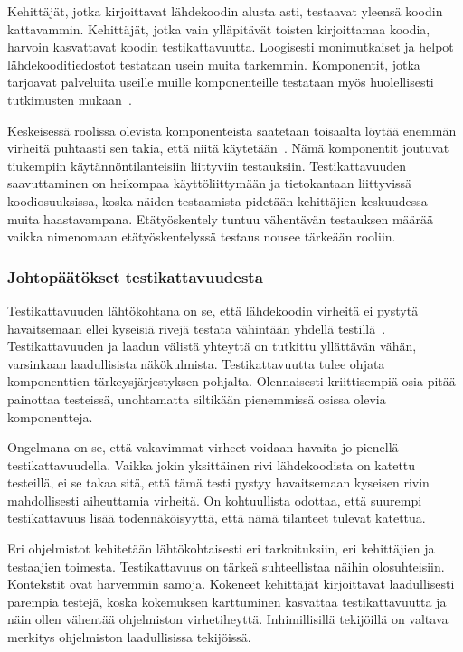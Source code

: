 \documentclass[finnish]{../tktltiki2}
\theoremstyle{definition}
\theoremstyle{remark}
\begin{document}
    Kehittäjät, jotka kirjoittavat lähdekoodin alusta asti, testaavat yleensä koodin kattavammin. Kehittäjät, jotka vain 
ylläpitävät toisten kirjoittamaa koodia, harvoin kasvattavat koodin testikattavuutta. Loogisesti monimutkaiset 
ja helpot lähdekooditiedostot testataan usein muita tarkemmin. Komponentit, jotka tarjoavat palveluita useille muille 
komponenteille testataan myös huolellisesti tutkimusten mukaan~\cite{MNDT09}.

    Keskeisessä roolissa olevista komponenteista saatetaan toisaalta löytää enemmän virheitä puhtaasti sen takia, että 
niitä käytetään~\cite{MNDT09}. Nämä komponentit joutuvat tiukempiin käytännöntilanteisiin liittyviin testauksiin. 
Testikattavuuden saavuttaminen on heikompaa käyttöliittymään ja tietokantaan liittyvissä koodiosuuksissa, koska näiden 
testaamista pidetään kehittäjien keskuudessa muita haastavampana. Etätyöskentely tuntuu vähentävän testauksen määrää 
vaikka nimenomaan etätyöskentelyssä testaus nousee tärkeään rooliin.

\subsubsection{Johtopäätökset testikattavuudesta}

Testikattavuuden lähtökohtana on se, että lähdekoodin virheitä ei pystytä havaitsemaan ellei kyseisiä rivejä testata 
vähintään yhdellä testillä~\cite{MNDT09}. Testikattavuuden ja laadun välistä yhteyttä on tutkittu yllättävän vähän, 
varsinkaan laadullisista näkökulmista. Testikattavuutta tulee ohjata komponenttien tärkeysjärjestyksen pohjalta. 
Olennaisesti kriittisempiä osia pitää painottaa testeissä, unohtamatta siltikään pienemmissä osissa olevia 
komponentteja.

    Ongelmana on se, että vakavimmat virheet voidaan havaita jo pienellä testikattavuudella. Vaikka jokin yksittäinen 
rivi lähdekoodista on katettu testeillä, ei se takaa sitä, että tämä testi pystyy havaitsemaan kyseisen rivin 
mahdollisesti aiheuttamia virheitä. On kohtuullista odottaa, että suurempi testikattavuus lisää todennäköisyyttä, että 
nämä tilanteet tulevat katettua.

    Eri ohjelmistot kehitetään lähtökohtaisesti eri tarkoituksiin, eri kehittäjien ja testaajien toimesta. 
Testikattavuus on tärkeä suhteellistaa näihin olosuhteisiin. Kontekstit ovat harvemmin samoja. Kokeneet kehittäjät 
kirjoittavat laadullisesti parempia testejä, koska kokemuksen karttuminen kasvattaa testikattavuutta ja näin ollen 
vähentää ohjelmiston virhetiheyttä. Inhimillisillä tekijöillä on valtava merkitys ohjelmiston laadullisissa tekijöissä.
\end{document}
